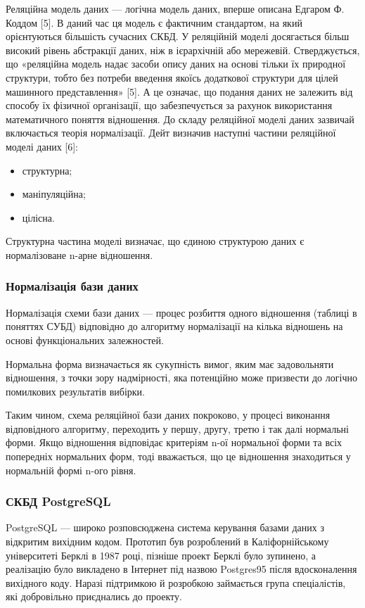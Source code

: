 Реляційна модель даних — логічна модель даних, вперше описана Едгаром Ф. Коддом [5]. В даний час ця модель є фактичним стандартом, на який орієнтуються більшість сучасних СКБД.
У реляційній моделі досягається більш високий рівень абстракції даних, ніж в ієрархічній або мережевій. Стверджується, що «реляційна модель надає засоби опису даних на основі тільки їх природної структури, тобто без потреби введення якоїсь додаткової структури для цілей машинного представлення» [5]. А це означає, що подання даних не залежить від способу їх фізичної організації, що забезпечується за рахунок використання математичного поняття відношення.
До складу реляційної моделі даних зазвичай включається теорія нормалізації. Дейт визначив наступні частини реляційної моделі даних [6]:
\begin{itemize}
	\item структурна;
	\item маніпуляційна;
	\item цілісна.
\end{itemize}

Структурна частина моделі визначає, що єдиною структурою даних є нормалізоване n-арне відношення.

\subsubsection{Нормалізація бази даних}

Нормалізація схеми бази даних — процес розбиття одного відношення (таблиці в поняттях СУБД) відповідно до алгоритму нормалізації на кілька відношень на основі функціональних залежностей.

Нормальна форма визначається як сукупність вимог, яким має задовольняти відношення, з точки зору надмірності, яка потенційно може призвести до логічно помилкових результатів вибірки.

Таким чином, схема реляційної бази даних покроково, у процесі виконання відповідного алгоритму, переходить у першу, другу, третю і так далі нормальні форми. Якщо відношення відповідає критеріям n-ої нормальної форми та всіх попередніх нормальних форм, тоді вважається, що це відношення знаходиться у нормальній формі n-ого рівня.

\subsubsection{СКБД PostgreSQL}

PostgreSQL — широко розповсюджена система керування базами даних з відкритим вихідним кодом. Прототип був розроблений в Каліфорнійському університеті Берклі в 1987 році, пізніше проект Берклі було зупинено, а реалізацію було викладено в Інтернет під назвою Postgres95 після вдосконалення вихідного коду. Наразі підтримкою й розробкою займається група спеціалістів, які добровільно приєднались до проекту.

